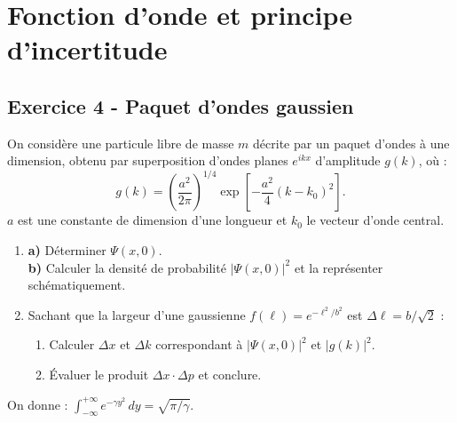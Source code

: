 \documentclass[12pt,a4paper]{article}
\begin{document}
\newpage
\section{Fonction d'onde et principe d'incertitude}

\subsection*{Exercice 4 - Paquet d'ondes gaussien \niveau{\difficile}}

\begin{boiteexercice}
On considère une particule libre de masse $m$ décrite par un paquet d'ondes à une dimension, obtenu
par superposition d'ondes planes $e^{ikx}$ d'amplitude $g(k)$, où :
\[
  g(k) = \left(\frac{a^2}{2\pi}\right)^{1/4}\exp\!\left[-\frac{a^2}{4}(k-k_0)^2\right].
\]
$a$ est une constante de dimension d'une longueur et $k_0$ le vecteur d'onde central.
\begin{enumerate}
  \item \textbf{a)} Déterminer $\Psi(x,0)$.\\
        \textbf{b)} Calculer la densité de probabilité $|\Psi(x,0)|^2$ et la représenter schématiquement.
  \item Sachant que la largeur d'une gaussienne $f(\ell) = e^{-\ell^2/b^2}$ est $\Delta\ell = b/\sqrt{2}$ :
    \begin{enumerate}
      \item Calculer $\Delta x$ et $\Delta k$ correspondant à $|\Psi(x,0)|^2$ et $|g(k)|^2$.
      \item Évaluer le produit $\Delta x\cdot\Delta p$ et conclure.
    \end{enumerate}
\end{enumerate}
On donne : $\displaystyle\int_{-\infty}^{+\infty} e^{-\gamma y^2}\,dy = \sqrt{\pi/\gamma}$.
\end{boiteexercice}
\end{document}

